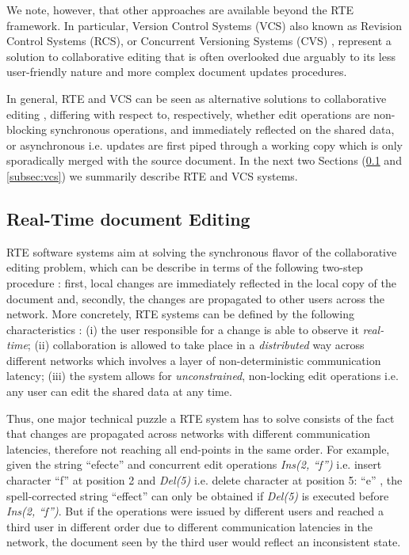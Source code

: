 \documentclass{sig-alternate}
\begin{document}
We note, however, that other approaches are available beyond the RTE framework. In
particular, Version Control Systems (VCS) \textemdash also known as Revision Control
Systems (RCS), or Concurrent Versioning Systems (CVS) \textemdash, represent a solution
to collaborative editing that is often overlooked due arguably to its less user-friendly
nature and more complex document updates procedures.

In general, RTE and VCS can be seen as alternative solutions to collaborative
editing \cite{Altmanninger2009}, differing with respect to, respectively, whether edit
operations are non-blocking synchronous operations, and immediately reflected on the shared
data, or asynchronous \textemdash i.e. updates are first piped
through a working copy which is only sporadically merged with the source document.
In the next two Sections (\ref{subsec:rte} and \ref{subsec:vcs}) we summarily describe RTE
and VCS systems.

\subsection{Real-Time document Editing}\label{subsec:rte}
RTE software systems aim at solving the synchronous flavor of the collaborative editing
problem, which can be describe in terms of the following two-step procedure \cite{Imine2009}:
first, local changes are immediately reflected in the local copy of the document and, secondly,
the changes are propagated to other users across the network.
More concretely, RTE systems can be defined by the following characteristics \cite{Sun1998}:
(i) the user responsible for a change is able to observe it \textit{real-time};
(ii) collaboration is allowed to take place in a \textit{distributed} way across
different networks \textemdash which involves a layer of non-deterministic communication
latency; (iii) the system allows for \textit{unconstrained}, non-locking edit operations
\textemdash i.e. any user can edit the shared data at any time.

Thus, one major technical puzzle a RTE system has to solve consists of the fact that changes
are propagated across networks with different communication latencies, therefore not
reaching all end-points in the same order. For example, given
the string ``efecte'' and concurrent edit operations \textit{Ins(2, ``f'')} \textemdash i.e.
insert character ``f'' at position 2 \textemdash and \textit{Del(5)} \textemdash i.e.
delete character at position 5: ``e'' \textemdash, the spell-corrected string ``effect''
can only be obtained if \textit{Del(5)} is executed before \textit{Ins(2, ``f'')}.
But if the operations were issued by different users and reached a third user in different
order due to different communication latencies in the network,
the document seen by the third user would reflect an inconsistent state.
\end{document}
